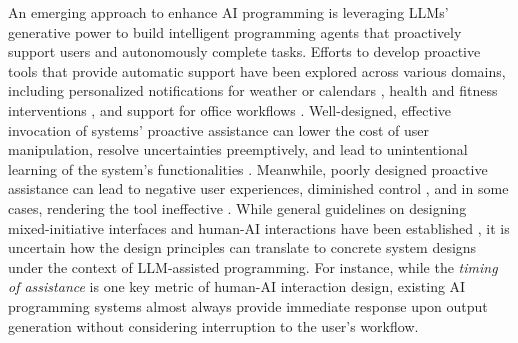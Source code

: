 An emerging approach to enhance AI programming is leveraging LLMs' generative power to build intelligent programming agents that proactively support users and autonomously complete tasks.
Efforts to develop proactive tools that provide automatic support have been explored across various domains, including personalized notifications for weather or calendars \cite{sun2016contextualintent, sarikaya2017digitalassistant}, health and fitness interventions \cite{schmidt2015fitness, rabbi2015healthfeedback}, and support for office workflows \cite{Baym2019clippy, Jacobs2019BeyondCC, matejka2011ambient}. 
Well-designed, effective invocation of systems' proactive assistance can lower the cost of user manipulation, resolve uncertainties preemptively, and lead to unintentional learning of the system's functionalities \cite{matejka2011ambient, horwitz1999mixedinitiative, Sawyer_2014_learning}.
Meanwhile, poorly designed proactive assistance can lead to negative user experiences, diminished control \cite{MORADIDAKHEL2023copilotliability, meurisch2020proactiveexpectation, barkhuus2003losecontrol}, and in some cases, rendering the tool ineffective \cite{meurisch2020proactiveexpectation, Baym2019clippy, Jacobs2019BeyondCC}.
While general guidelines on designing mixed-initiative interfaces and human-AI interactions have been established \cite{horwitz1999mixedinitiative, amershi2019haiprinciple}, it is uncertain how the design principles can translate to concrete system designs under the context of LLM-assisted programming.
For instance, while the \emph{timing of assistance} is one key metric of human-AI interaction design, existing AI programming systems almost always provide immediate response upon output generation without considering interruption to the user's workflow.

